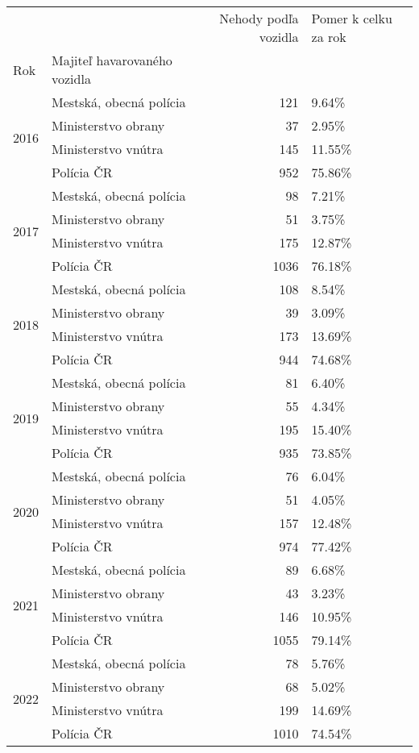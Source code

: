 \documentclass{article}
\begin{document}
\begin{tabular}{llrl}
\toprule
 &  & Nehody podľa vozidla & Pomer k celku za rok \\
Rok & Majiteľ havarovaného vozidla &  &  \\
\midrule
\multirow[t]{4}{*}{2016} & Mestská, obecná polícia & 121 & 9.64\% \\
 & Ministerstvo obrany & 37 & 2.95\% \\
 & Ministerstvo vnútra & 145 & 11.55\% \\
 & Polícia ČR & 952 & 75.86\% \\
\cline{1-4}
\multirow[t]{4}{*}{2017} & Mestská, obecná polícia & 98 & 7.21\% \\
 & Ministerstvo obrany & 51 & 3.75\% \\
 & Ministerstvo vnútra & 175 & 12.87\% \\
 & Polícia ČR & 1036 & 76.18\% \\
\cline{1-4}
\multirow[t]{4}{*}{2018} & Mestská, obecná polícia & 108 & 8.54\% \\
 & Ministerstvo obrany & 39 & 3.09\% \\
 & Ministerstvo vnútra & 173 & 13.69\% \\
 & Polícia ČR & 944 & 74.68\% \\
\cline{1-4}
\multirow[t]{4}{*}{2019} & Mestská, obecná polícia & 81 & 6.40\% \\
 & Ministerstvo obrany & 55 & 4.34\% \\
 & Ministerstvo vnútra & 195 & 15.40\% \\
 & Polícia ČR & 935 & 73.85\% \\
\cline{1-4}
\multirow[t]{4}{*}{2020} & Mestská, obecná polícia & 76 & 6.04\% \\
 & Ministerstvo obrany & 51 & 4.05\% \\
 & Ministerstvo vnútra & 157 & 12.48\% \\
 & Polícia ČR & 974 & 77.42\% \\
\cline{1-4}
\multirow[t]{4}{*}{2021} & Mestská, obecná polícia & 89 & 6.68\% \\
 & Ministerstvo obrany & 43 & 3.23\% \\
 & Ministerstvo vnútra & 146 & 10.95\% \\
 & Polícia ČR & 1055 & 79.14\% \\
\cline{1-4}
\multirow[t]{4}{*}{2022} & Mestská, obecná polícia & 78 & 5.76\% \\
 & Ministerstvo obrany & 68 & 5.02\% \\
 & Ministerstvo vnútra & 199 & 14.69\% \\
 & Polícia ČR & 1010 & 74.54\% \\
\cline{1-4}
\bottomrule
\end{tabular}
\end{document}
